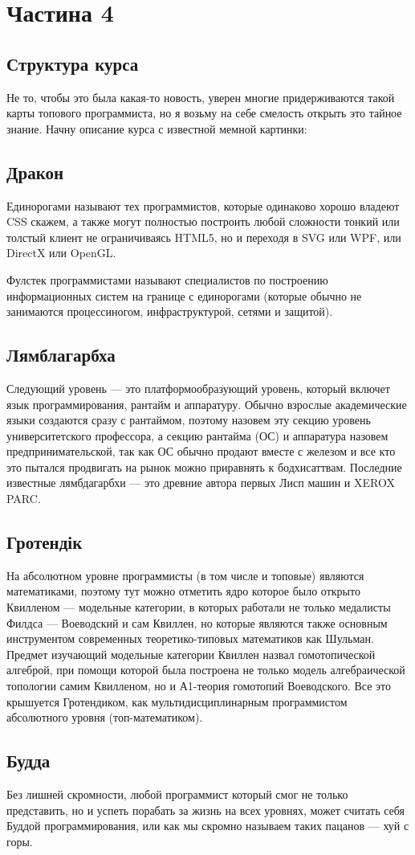 \section{Частина 4}

\subsection{Структура курса}

Не то, чтобы это была какая-то новость, уверен многие придерживаются такой карты топового программиста, но я возьму на себе смелость открыть это тайное знание. Начну описание курса с известной мемной картинки:

\subsection{Дракон}

Единорогами называют тех программистов, которые одинаково хорошо владеют CSS скажем, а также могут полностью построить любой сложности тонкий или толстый клиент не ограничиваясь HTML5, но и переходя в SVG или WPF, или DirectX или OpenGL.

Фулстек программистами называют специалистов по построению информационных систем на границе с единорогами (которые обычно не занимаются процессиногом, инфраструктурой, сетями и защитой).

\subsection{Лямблагарбха}

Следующий уровень — это платформообразующий уровень, который включет язык программирования, рантайм и аппаратуру. Обычно взрослые академические языки создаются сразу с рантаймом, поэтому назовем эту секцию уровень университетского профессора, а секцию рантайма (ОС) и аппаратура назовем предпринимательской, так как ОС обычно продают вместе с железом и все кто это пытался продвигать на рынок можно приравнять к бодхисаттвам. Последние известные лямбдагарбхи — это древние автора первых Лисп машин и XEROX PARC.

\subsection{Гротендік}

На абсолютном уровне программисты (в том числе и топовые) являются математиками, поэтому тут можно отметить ядро которое было открыто Квилленом — модельные категории, в которых работали не только медалисты Филдса — Воеводский и сам Квиллен, но которые являются также основным инструментом современных теоретико-типовых математиков как Шульман. Предмет изучающий модельные категории Квиллен назвал гомотопической алгеброй, при помощи которой была построена не только модель алгебраической топологии самим Квилленом, но и А1-теория гомотопий Воеводского. Все это крышуется Гротендиком, как мультидисциплинарным программистом абсолютного уровня (топ-математиком).

\subsection{Будда}

Без лишней скромности, любой программист который смог не только представить, но и успеть порабать за жизнь на всех уровнях, может считать себя Буддой программирования, или как мы скромно называем таких пацанов — хуй с горы.

\normalsize
